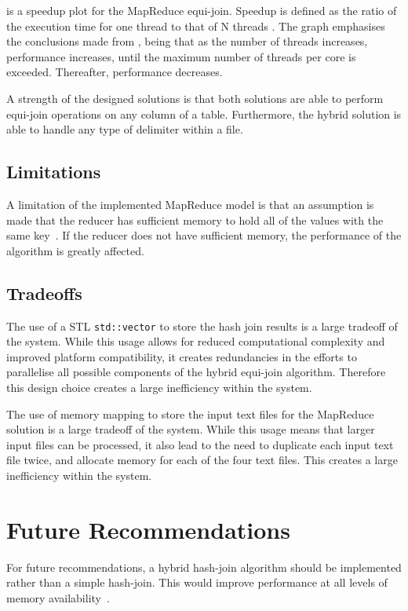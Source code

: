 \documentclass[11pt,twocolumn]{witseiepaper}
\begin{document}
 is a speedup plot for the MapReduce equi-join. Speedup is defined as the ratio of the execution time for one thread to that of N threads \cite{speedup}. The graph emphasises the conclusions made from , being that as the number of threads increases, performance increases, until the maximum number of threads per core is exceeded. Thereafter, performance decreases.

A strength of the designed solutions is that both solutions are able to perform equi-join operations on any column of a table. Furthermore, the hybrid solution is able to handle any type of delimiter within a file.

\subsection{Limitations}
A limitation of the implemented MapReduce model is that an assumption is made that the reducer has sufficient memory to hold all of the values with the same key~\cite{mapReduceJoin}. If the reducer does not have sufficient memory, the performance of the algorithm is greatly affected.

\subsection{Tradeoffs} \label{sec:tradeoffs}
The use of a STL \texttt{std::vector} to store the hash join results is a large tradeoff of the system. While this usage allows for reduced computational complexity and improved platform compatibility, it creates redundancies in the efforts to parallelise all possible components of the hybrid equi-join algorithm. Therefore this design choice creates a large inefficiency within the system.

The use of memory mapping to store the input text files for the MapReduce solution is a large tradeoff of the system. While this usage means that larger input files can be processed, it also lead to the need to duplicate each input text file twice, and allocate memory for each of the four text files. This creates a large inefficiency within the system.

\section{Future Recommendations}
For future recommendations, a hybrid hash-join algorithm should be implemented rather than a simple hash-join. This would improve performance at all levels of memory availability~\cite{evaluating4JoinAlgorithms}.
\end{document}
